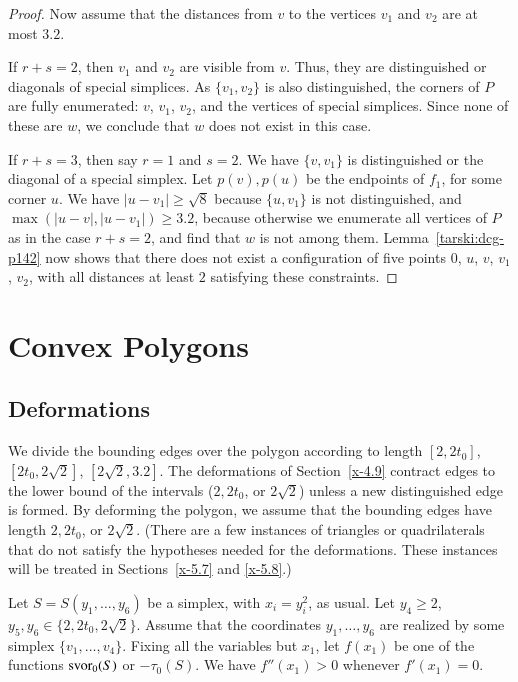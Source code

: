 \begin{proof}
Now assume that the distances from $v$ to the vertices $v_1$ and
$v_2$ are at most $3.2$.

If $r+s=2$, then $v_1$ and $v_2$ are visible from $v$. Thus, they
are distinguished or diagonals of special simplices. As
$\{v_1,v_2\}$ is also distinguished, the corners of $P$ are fully
enumerated: $v$, $v_1$, $v_2$, and the vertices of special
simplices.  Since none of these are $w$, we conclude that $w$ does
not exist in this case.

If $r+s=3$, then say $r=1$ and $s=2$. We have $\{v,v_1\}$ is
distinguished or the diagonal of a special simplex. Let
$p(v),p(u)$ be the endpoints of $f_1$, for some corner $u$. We
have $|u-v_1|\ge\sqrt8$ because $\{u,v_1\}$ is not distinguished,
and $\max(|u-v|,|u-v_1|)\ge3.2$, because otherwise we enumerate
all vertices of $P$ as in the case $r+s=2$, and find that $w$ is
not among them. Lemma~\ref{tarski:dcg-p142} now shows that
there does not exist a configuration of five points
$0$, $u$, $v$, $v_1$, $v_2$, with all distances at least $2$
satisfying these constraints.
\end{proof}


\chapter{Convex Polygons}%

\section{Deformations} %
We divide the bounding edges over the polygon according to length
$[2,2t_0]$, $[2t_0,2\sqrt{2}]$, $[2\sqrt{2},3.2]$. The deformations of
Section~\ref{x-4.9} contract edges to the lower bound of the intervals
($2,2t_0$, or $2\sqrt{2}$) unless a new distinguished edge is formed. By
deforming the polygon, we assume that the bounding edges have length
$2,2t_0$, or $2\sqrt{2}$. (There are a few instances of triangles or
quadrilaterals that do not satisfy the hypotheses needed for the
deformations. These instances will be treated in Sections~\ref{x-5.7}
and \ref{x-5.8}.)

\begin{lemma}
Let $S=S(y_1,\ldots,y_6)$ be a simplex, with $x_i=y_i^2$,
as usual.  Let $y_4\ge 2$,
    $y_5,y_6\in\{2,2t_0,2\sqrt{2}\}$.
Assume that the coordinates $y_1,\ldots,y_6$ are realized by
some simplex $\{v_1,\ldots,v_4\}$.  %
Fixing all the variables but $x_1$, let $f(x_1)$ be one of the
functions $\operatorname{svor}_0(S)$ or $-\tau_0(S)$. We have $f''(x_1)>0$
whenever $f'(x_1)=0$.
\end{lemma}

